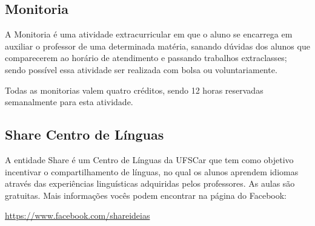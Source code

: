 \subsection{Monitoria}
A Monitoria é uma atividade extracurricular em que o aluno se encarrega em auxiliar o professor de uma determinada matéria, sanando dúvidas dos alunos que comparecerem ao horário de atendimento e passando trabalhos extraclasses; sendo possível essa atividade ser realizada com bolsa ou voluntariamente.

Todas as monitorias valem quatro créditos, sendo 12 horas reservadas semanalmente para esta atividade.

\subsection{Share Centro de Línguas}
A entidade Share é um Centro de Línguas da UFSCar que tem como objetivo incentivar o compartilhamento de línguas, no qual os alunos aprendem idiomas através das experiências linguísticas adquiridas pelos professores. As aulas são gratuitas.
Mais informações vocês podem encontrar na página do Facebook:

\url{https://www.facebook.com/shareideias}
